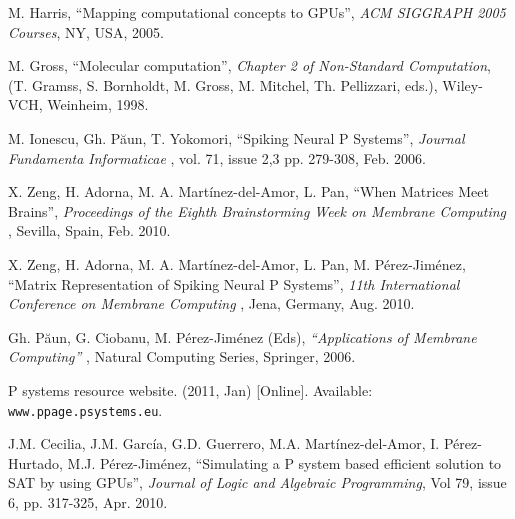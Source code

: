\documentclass{svmultm}
\newcommand{\redmark}[1]{\color{red} #1 \color{black}}
\begin{document}
\begin{thebibliography}{9999}



 M. Harris, ``Mapping computational concepts to GPUs'', {\it ACM SIGGRAPH 2005 Courses}, NY, USA, 2005.

 M. Gross,  ``Molecular computation'', {\it Chapter 2 of Non-Standard Computation}, (T. Gramss,
S. Bornholdt, M. Gross, M. Mitchel, Th. Pellizzari, eds.), Wiley-VCH, Weinheim, 1998.


 M. Ionescu, Gh. P\u aun, T. Yokomori, ``Spiking Neural P Systems'', {\it Journal Fundamenta Informaticae  }, vol. 71, issue 2,3 pp. 279-308, Feb. 2006.

\redmark{
 X. Zeng, H. Adorna, M. A. Mart\'{i}nez-del-Amor, L. Pan, ``When Matrices Meet Brains'', {\it Proceedings of the Eighth Brainstorming Week on Membrane Computing }, Sevilla, Spain, Feb. 2010.

\bibitem{snpmat} X. Zeng, H. Adorna, M. A. Mart\'{i}nez-del-Amor, L. Pan, M. P\'{e}rez-Jim\'{e}nez, ``Matrix Representation of Spiking Neural P Systems'', {\it 11th International Conference on Membrane Computing }, Jena, Germany, Aug. 2010.
}

 Gh. P\u aun, G. Ciobanu, M. P\'{e}rez-Jim\'{e}nez (Eds), {\it ``Applications of Membrane Computing'' }, Natural Computing Series, Springer, 2006.

 P systems resource website. (2011, Jan) [Online]. Available: {\tt www.ppage.psystems.eu}.

\redmark{

 J.M. Cecilia, J.M. Garc\'{i}a, G.D. Guerrero, M.A. Mart\'{i}nez-del-Amor, I. P\'{e}rez-Hurtado, M.J. P\'{e}rez-Jim\'{e}nez, ``Simulating a P system based efficient solution to SAT by using GPUs'', {\it Journal of Logic and Algebraic Programming}, Vol 79, issue 6, pp. 317-325, Apr. 2010.

}
\end{thebibliography}
\end{document}
